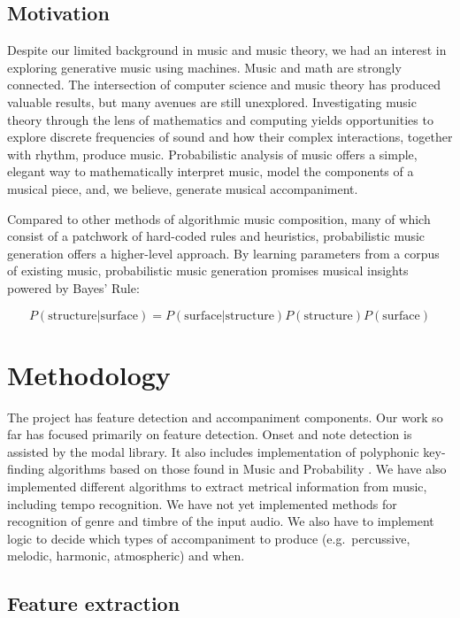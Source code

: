 \documentclass[11pt,conference,letterpaper]{IEEEtran}
\begin{document}

\subsection{Motivation}

Despite our limited background in music and music theory, we had an interest in exploring generative music using machines. Music and math are strongly connected. The intersection of computer science and music theory has produced valuable results, but many avenues are still unexplored. Investigating music theory through the lens of mathematics and computing yields opportunities to explore discrete frequencies of sound and how their complex interactions, together with rhythm, produce music. Probabilistic analysis of music offers a simple, elegant way to mathematically interpret music, model the components of a musical piece, and, we believe, generate musical accompaniment.

Compared to other methods of algorithmic music composition, many of which consist of a patchwork of hard-coded rules and heuristics, probabilistic music generation offers a higher-level approach. By learning parameters from a corpus of existing music, probabilistic music generation promises musical insights powered by Bayes' Rule:

{\small
\[ P(\text{structure}|\text{surface}) = P(\text{surface}|\text{structure})P(\text{structure})P(\text{surface}) \]
}

\section{Methodology}

The project has feature detection and accompaniment components. Our work so far has focused primarily on feature detection. Onset and note detection is assisted by the modal library. It also includes implementation of polyphonic key-finding algorithms based on those found in Music and Probability \cite{temperly2007mprob}. We have also implemented different algorithms to extract metrical information from music, including tempo recognition. We have not yet implemented methods for recognition of genre and timbre of the input audio. We also have to implement logic to decide which types of accompaniment to produce (e.g.\ percussive, melodic, harmonic, atmospheric) and when.

\subsection{Feature extraction}
\end{document}
